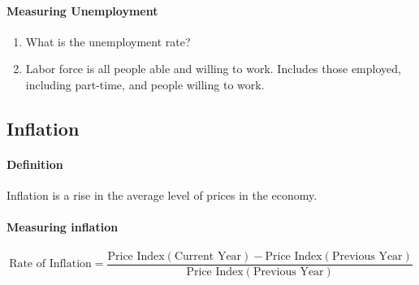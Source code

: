 \paragraph{Measuring Unemployment}

\begin{enumerate}
	\item What is the unemployment rate?

	\item Labor force is all people able and willing to work. Includes those employed, including part-time, and people willing to work.
\end{enumerate}

\subsection{Inflation}
\paragraph{Definition} Inflation is a rise in the average level of prices in the economy.

\paragraph{Measuring inflation}
\[
	\text{Rate of Inflation} = \frac{\text{Price Index}(\text{Current Year}) - \text{Price Index}(\text{Previous Year})}{\text{Price Index}(\text{Previous Year})}
\]
